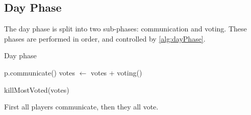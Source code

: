 \subsection{Day Phase}\label{sec:dayPhase}
The day phase is split into two sub-phases: communication and voting. These
phases are performed in order, and controlled by \cref{alg:dayPhase}.
\begin{algorithm}[H]
	\caption{Day phase}
	\begin{algorithmic}[1]
		\State p.communicate()
		\EndFor
		\State votes $\gets$ votes + voting()
		\EndFor

		\State killMostVoted(votes)
		\EndFunction
	\end{algorithmic}\label{alg:dayPhase}
\end{algorithm}
\setcounter{algorithmcaption}{1}
First all players communicate, then they all vote.


